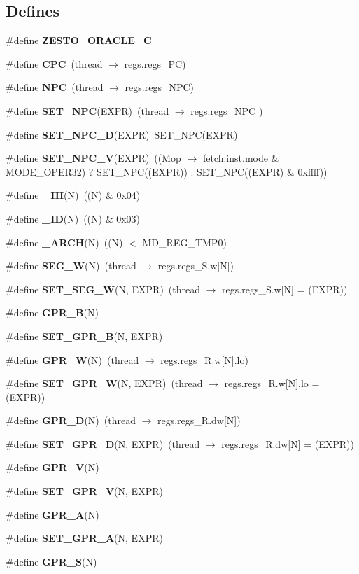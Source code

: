 \subsection*{Defines}
\begin{CompactItemize}
\item 
\#define {\bf ZESTO\_\-ORACLE\_\-C}
\item 
\#define {\bf CPC}~(thread $\rightarrow$ regs.regs\_\-PC)
\item 
\#define {\bf NPC}~(thread $\rightarrow$ regs.regs\_\-NPC)
\item 
\#define {\bf SET\_\-NPC}(EXPR)~(thread $\rightarrow$ regs.regs\_\-NPC )
\item 
\#define {\bf SET\_\-NPC\_\-D}(EXPR)~SET\_\-NPC(EXPR)
\item 
\#define {\bf SET\_\-NPC\_\-V}(EXPR)~((Mop $\rightarrow$ fetch.inst.mode \& MODE\_\-OPER32) ? SET\_\-NPC((EXPR)) : SET\_\-NPC((EXPR) \& 0xffff))
\item 
\#define {\bf \_\-HI}(N)~((N) \& 0x04)
\item 
\#define {\bf \_\-ID}(N)~((N) \& 0x03)
\item 
\#define {\bf \_\-ARCH}(N)~((N) $<$ MD\_\-REG\_\-TMP0)
\item 
\#define {\bf SEG\_\-W}(N)~(thread $\rightarrow$ regs.regs\_\-S.w[N])
\item 
\#define {\bf SET\_\-SEG\_\-W}(N, EXPR)~(thread $\rightarrow$ regs.regs\_\-S.w[N] = (EXPR))
\item 
\#define {\bf GPR\_\-B}(N)
\item 
\#define {\bf SET\_\-GPR\_\-B}(N, EXPR)
\item 
\#define {\bf GPR\_\-W}(N)~(thread $\rightarrow$ regs.regs\_\-R.w[N].lo)
\item 
\#define {\bf SET\_\-GPR\_\-W}(N, EXPR)~(thread $\rightarrow$ regs.regs\_\-R.w[N].lo = (EXPR))
\item 
\#define {\bf GPR\_\-D}(N)~(thread $\rightarrow$ regs.regs\_\-R.dw[N])
\item 
\#define {\bf SET\_\-GPR\_\-D}(N, EXPR)~(thread $\rightarrow$ regs.regs\_\-R.dw[N] = (EXPR))
\item 
\#define {\bf GPR\_\-V}(N)
\item 
\#define {\bf SET\_\-GPR\_\-V}(N, EXPR)
\item 
\#define {\bf GPR\_\-A}(N)
\item 
\#define {\bf SET\_\-GPR\_\-A}(N, EXPR)
\item 
\#define {\bf GPR\_\-S}(N)
\item 

\end{CompactItemize}
